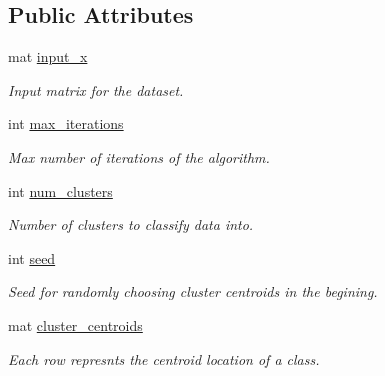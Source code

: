\subsection*{Public Attributes}
\begin{DoxyCompactItemize}
\item 
\mbox{\label{classKMClassifier_a046cf5cafacf50f621969042830ebccc}} 
mat \hyperlink{classKMClassifier_a046cf5cafacf50f621969042830ebccc}{input\+\_\+x}
\begin{DoxyCompactList}\small\item\em Input matrix for the dataset. \end{DoxyCompactList}\item 
\mbox{\label{classKMClassifier_a4abdb99ad18d92da4ee79ca95b8484e0}} 
int \hyperlink{classKMClassifier_a4abdb99ad18d92da4ee79ca95b8484e0}{max\+\_\+iterations}
\begin{DoxyCompactList}\small\item\em Max number of iterations of the algorithm. \end{DoxyCompactList}\item 
\mbox{\label{classKMClassifier_a7fbe0e57ba8330693dfa9c5a0beb4a9c}} 
int \hyperlink{classKMClassifier_a7fbe0e57ba8330693dfa9c5a0beb4a9c}{num\+\_\+clusters}
\begin{DoxyCompactList}\small\item\em Number of clusters to classify data into. \end{DoxyCompactList}\item 
\mbox{\label{classKMClassifier_af2b1c8cb2dca371adf96fd025f12ec97}} 
int \hyperlink{classKMClassifier_af2b1c8cb2dca371adf96fd025f12ec97}{seed}
\begin{DoxyCompactList}\small\item\em Seed for randomly choosing cluster centroids in the begining. \end{DoxyCompactList}\item 
\mbox{\label{classKMClassifier_a56f71bae126e5e8ecb5fb62d2428f799}} 
mat \hyperlink{classKMClassifier_a56f71bae126e5e8ecb5fb62d2428f799}{cluster\+\_\+centroids}
\begin{DoxyCompactList}\small\item\em Each row represnts the centroid location of a class. \end{DoxyCompactList}\item 

\end{DoxyCompactItemize}
